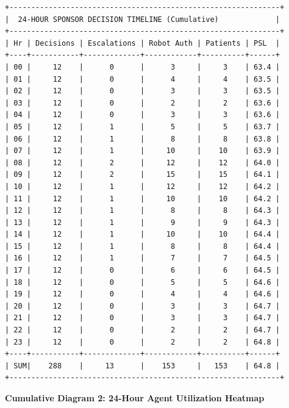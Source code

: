\begin{verbatim}
+--------------------------------------------------------------+
|  24-HOUR SPONSOR DECISION TIMELINE (Cumulative)             |
+--------------------------------------------------------------+
| Hr | Decisions | Escalations | Robot Auth | Patients | PSL  |
+----+-----------+-------------+------------+----------+------+
| 00 |     12    |      0      |      3     |     3    | 63.4 |
| 01 |     12    |      0      |      4     |     4    | 63.5 |
| 02 |     12    |      0      |      3     |     3    | 63.5 |
| 03 |     12    |      0      |      2     |     2    | 63.6 |
| 04 |     12    |      0      |      3     |     3    | 63.6 |
| 05 |     12    |      1      |      5     |     5    | 63.7 |
| 06 |     12    |      1      |      8     |     8    | 63.8 |
| 07 |     12    |      1      |     10     |    10    | 63.9 |
| 08 |     12    |      2      |     12     |    12    | 64.0 |
| 09 |     12    |      2      |     15     |    15    | 64.1 |
| 10 |     12    |      1      |     12     |    12    | 64.2 |
| 11 |     12    |      1      |     10     |    10    | 64.2 |
| 12 |     12    |      1      |      8     |     8    | 64.3 |
| 13 |     12    |      1      |      9     |     9    | 64.3 |
| 14 |     12    |      1      |     10     |    10    | 64.4 |
| 15 |     12    |      1      |      8     |     8    | 64.4 |
| 16 |     12    |      1      |      7     |     7    | 64.5 |
| 17 |     12    |      0      |      6     |     6    | 64.5 |
| 18 |     12    |      0      |      5     |     5    | 64.6 |
| 19 |     12    |      0      |      4     |     4    | 64.6 |
| 20 |     12    |      0      |      3     |     3    | 64.7 |
| 21 |     12    |      0      |      3     |     3    | 64.7 |
| 22 |     12    |      0      |      2     |     2    | 64.7 |
| 23 |     12    |      0      |      2     |     2    | 64.8 |
+----+-----------+-------------+------------+----------+------+
| SUM|    288    |     13      |    153     |   153    | 64.8 |
+--------------------------------------------------------------+
\end{verbatim}

\textbf{Cumulative Diagram 2: 24-Hour Agent Utilization Heatmap}

